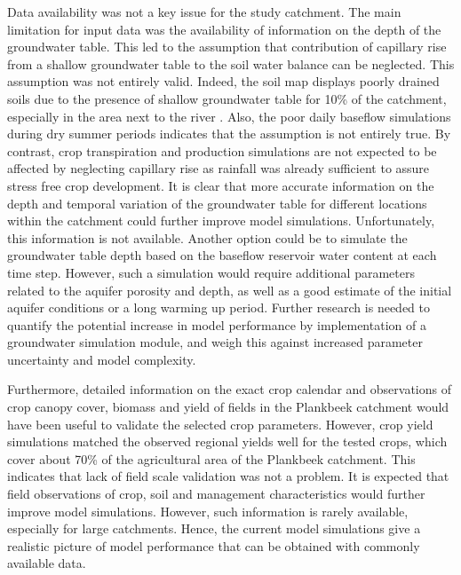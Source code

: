 Data availability was not a key issue for the study catchment. The main limitation for input data was the availability of information on the depth of the groundwater table. This led to the assumption that contribution of capillary rise from a shallow groundwater table to the soil water balance can be neglected. This assumption was not entirely valid. Indeed, the soil map displays poorly drained soils due to the presence of shallow groundwater table for 10\% of the catchment, especially in the area next to the river \parencite{dov2014}. Also, the poor daily baseflow simulations during dry summer periods indicates that the assumption is not entirely true. By contrast, crop transpiration and production simulations are not expected to be affected by neglecting capillary rise as rainfall was already sufficient to assure stress free crop development. It is clear that more accurate information on the depth and temporal variation of the groundwater table for different locations within the catchment could further improve model simulations. Unfortunately, this information is not available. Another option could be to simulate the groundwater table depth based on the baseflow reservoir water content at each time step. However, such a simulation would require additional parameters related to the aquifer porosity and depth, as well as a good estimate of the initial aquifer conditions or a long warming up period. Further research is needed to quantify the potential increase in model performance by implementation of a groundwater simulation module, and weigh this against increased parameter uncertainty and model complexity. 

Furthermore, detailed information on the exact crop calendar and observations of crop canopy cover, biomass and yield of fields in the Plankbeek catchment would have been useful to validate the selected crop parameters. However, crop yield simulations matched the observed regional yields well for the tested crops, which cover about 70\% of the agricultural area of the Plankbeek catchment. This indicates that lack of field scale validation was not a problem. It is expected that field observations of crop, soil and management characteristics would further improve model simulations. However, such information is rarely available, especially for large catchments. Hence, the current model simulations give a realistic picture of model performance that can be obtained with commonly available data.

